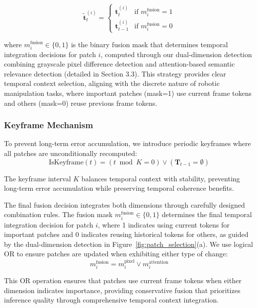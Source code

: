 \documentclass[letterpaper]{article}
\begin{document}
\begin{equation}
\tilde{\mathbf{t}}_t^{(i)} = \begin{cases}
\mathbf{t}_t^{(i)} & \text{if } m_i^{\text{fusion}} = 1 \\
\mathbf{t}_{t-1}^{(i)} & \text{if } m_i^{\text{fusion}} = 0
\end{cases}
\end{equation}

where $m_i^{\text{fusion}} \in \{0,1\}$ is the binary fusion mask that determines temporal integration decisions for patch $i$, computed through our dual-dimension detection combining grayscale pixel difference detection and attention-based semantic relevance detection (detailed in Section 3.3). This strategy provides clear temporal context selection, aligning with the discrete nature of robotic manipulation tasks, where important patches (mask=1) use current frame tokens and others (mask=0) reuse previous frame tokens.

\subsubsection{Keyframe Mechanism}
To prevent long-term error accumulation, we introduce periodic keyframes where all patches are unconditionally recomputed:
\begin{equation}
\text{IsKeyframe}(t) = (t \bmod K = 0) \lor (\mathbf{T}_{t-1} = \emptyset)
\end{equation}

The keyframe interval $K$ balances temporal context with stability, preventing long-term error accumulation while preserving temporal coherence benefits.


The final fusion decision integrates both dimensions through carefully designed combination rules. The fusion mask $m_i^{\text{fusion}} \in \{0,1\}$ determines the final temporal integration decision for patch $i$, where 1 indicates using current tokens for important patches and 0 indicates reusing historical tokens for others, as guided by the dual-dimension detection in Figure~\ref{fig:patch_selection}(a). We use logical OR to ensure patches are updated when exhibiting either type of change:
\begin{equation}
m_i^{\text{fusion}} = m_i^{\text{pixel}} \lor m_i^{\text{attention}}
\end{equation}

This OR operation ensures that patches use current frame tokens when either dimension indicates importance, providing conservative fusion that prioritizes inference quality through comprehensive temporal context integration.
\end{document}
